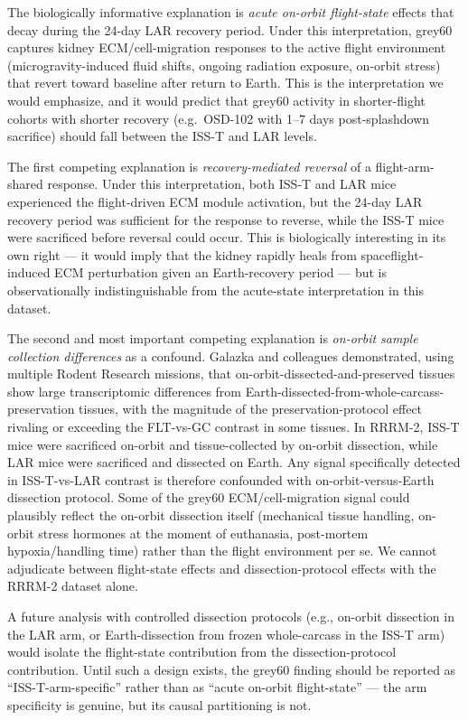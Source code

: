 \documentclass[11pt]{article}
\begin{document}
The biologically informative explanation is \emph{acute on-orbit flight-state} effects that decay during the 24-day LAR recovery period. Under this interpretation, grey60 captures kidney ECM/cell-migration responses to the active flight environment (microgravity-induced fluid shifts, ongoing radiation exposure, on-orbit stress) that revert toward baseline after return to Earth. This is the interpretation we would emphasize, and it would predict that grey60 activity in shorter-flight cohorts with shorter recovery (e.g.\ OSD-102 with 1--7 days post-splashdown sacrifice) should fall between the ISS-T and LAR levels.

The first competing explanation is \emph{recovery-mediated reversal} of a flight-arm-shared response. Under this interpretation, both ISS-T and LAR mice experienced the flight-driven ECM module activation, but the 24-day LAR recovery period was sufficient for the response to reverse, while the ISS-T mice were sacrificed before reversal could occur. This is biologically interesting in its own right --- it would imply that the kidney rapidly heals from spaceflight-induced ECM perturbation given an Earth-recovery period --- but is observationally indistinguishable from the acute-state interpretation in this dataset.

The second and most important competing explanation is \emph{on-orbit sample collection differences} as a confound. Galazka and colleagues \citep{galazka2020rnaseq} demonstrated, using multiple Rodent Research missions, that on-orbit-dissected-and-preserved tissues show large transcriptomic differences from Earth-dissected-from-whole-carcass-preservation tissues, with the magnitude of the preservation-protocol effect rivaling or exceeding the FLT-vs-GC contrast in some tissues. In RRRM-2, ISS-T mice were sacrificed on-orbit and tissue-collected by on-orbit dissection, while LAR mice were sacrificed and dissected on Earth. Any signal specifically detected in ISS-T-vs-LAR contrast is therefore confounded with on-orbit-versus-Earth dissection protocol. Some of the grey60 ECM/cell-migration signal could plausibly reflect the on-orbit dissection itself (mechanical tissue handling, on-orbit stress hormones at the moment of euthanasia, post-mortem hypoxia/handling time) rather than the flight environment per se. We cannot adjudicate between flight-state effects and dissection-protocol effects with the RRRM-2 dataset alone.

A future analysis with controlled dissection protocols (e.g., on-orbit dissection in the LAR arm, or Earth-dissection from frozen whole-carcass in the ISS-T arm) would isolate the flight-state contribution from the dissection-protocol contribution. Until such a design exists, the grey60 finding should be reported as ``ISS-T-arm-specific'' rather than as ``acute on-orbit flight-state'' --- the arm specificity is genuine, but its causal partitioning is not.
\end{document}
